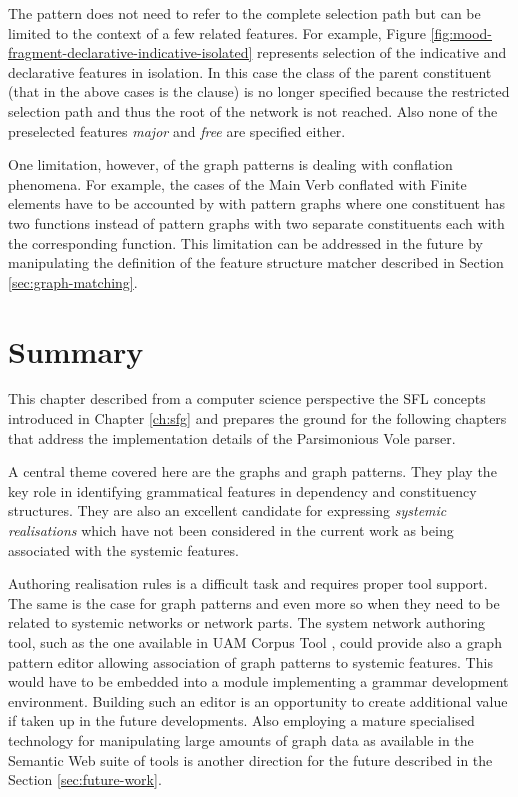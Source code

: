     The pattern does not need to refer to the complete selection path but can be limited to the context of a few related features. For example, Figure \ref{fig:mood-fragment-declarative-indicative-isolated} represents selection of the indicative and declarative features in isolation. In this case the class of the parent constituent (that in the above cases is the clause) is no longer specified because the restricted selection path and thus the root of the network is not reached. Also none of the preselected features \textit{major} and \textit{free} are specified either.  

    One limitation, however, of the graph patterns is dealing with conflation phenomena. For example, the cases of the Main Verb conflated with Finite elements have to be accounted by with pattern graphs where one constituent has two functions instead of pattern graphs with two separate constituents each with the corresponding function. This limitation can be addressed in the future by manipulating the definition of the feature structure matcher described in Section \ref{sec:graph-matching}.

\section{Summary}
    This chapter described from a computer science perspective the SFL concepts introduced in Chapter \ref{ch:sfg} and prepares the ground for the following chapters that address the implementation details of the Parsimonious Vole parser.  

    A central theme covered here are the graphs and graph patterns. They play the key role in identifying grammatical features in dependency and constituency structures. They are also an excellent candidate for expressing \textit{systemic realisations} which have not been considered in the current work as being associated with the systemic features.  

    Authoring realisation rules is a difficult task and requires proper tool support. The same is the case for graph patterns and even more so when they need to be related to systemic networks or network parts. The system network authoring tool, such as the one available in UAM Corpus Tool \citep{ODonnell2008a}, could provide also a graph pattern editor allowing association of graph patterns to systemic features. This would have to be embedded into a module implementing a grammar development environment. Building such an editor is an opportunity to create additional value if taken up in the future developments. Also employing a mature specialised technology for manipulating large amounts of graph data as available in the Semantic Web suite of tools is another direction for the future described in the Section \ref{sec:future-work}.

